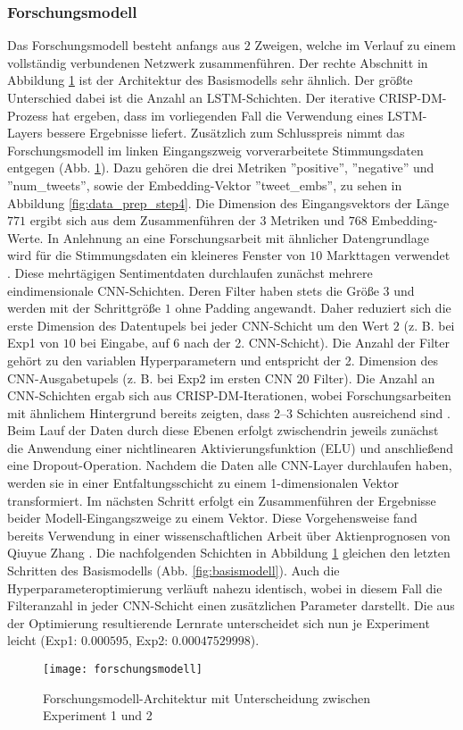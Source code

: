 \subsubsection{Forschungsmodell}\label{sec:modellierung_forsch}

Das Forschungsmodell besteht anfangs aus $2$ Zweigen, welche im Verlauf zu einem vollständig verbundenen Netzwerk zusammenführen. Der rechte Abschnitt in Abbildung \ref{fig:forschungsmodell} ist der Architektur des Basismodells sehr ähnlich. Der größte Unterschied dabei ist die Anzahl an \ac{LSTM}-Schichten. Der iterative \ac{CRISP-DM}-Prozess hat ergeben, dass im vorliegenden Fall die Verwendung eines \ac{LSTM}-Layers bessere Ergebnisse liefert.
Zusätzlich zum Schlusspreis nimmt das Forschungsmodell im linken Eingangszweig vorverarbeitete Stimmungsdaten entgegen (Abb. \ref{fig:forschungsmodell}). Dazu gehören die drei Metriken ''positive'', ''negative'' und ''num\_tweets'', sowie der Embedding-Vektor ''tweet\_embs'', zu sehen in Abbildung \ref{fig:data_prep_step4}. Die Dimension des Eingangsvektors der Länge $771$ ergibt sich aus dem Zusammenführen der $3$ Metriken und $768$ Embedding-Werte. In Anlehnung an eine Forschungsarbeit mit ähnlicher Datengrundlage wird für die Stimmungsdaten ein kleineres Fenster von $10$ Markttagen verwendet \autocite[Kap. 4.1]{zhang2022transformer}.
Diese mehrtägigen Sentimentdaten durchlaufen zunächst mehrere eindimensionale \ac{CNN}-Schichten. Deren Filter haben stets die Größe $3$ und werden mit der Schrittgröße $1$ ohne Padding angewandt. Daher reduziert sich die erste Dimension des Datentupels bei jeder \ac{CNN}-Schicht um den Wert $2$ (z. B. bei Exp1 von $10$ bei Eingabe, auf $6$ nach der 2. \ac{CNN}-Schicht). Die Anzahl der Filter gehört zu den variablen Hyperparametern und entspricht der 2. Dimension des \ac{CNN}-Ausgabetupels (z. B. bei Exp2 im ersten CNN $20$ Filter).
Die Anzahl an \ac{CNN}-Schichten ergab sich aus \ac{CRISP-DM}-Iterationen, wobei Forschungsarbeiten mit ähnlichem Hintergrund bereits zeigten, dass 2–3 Schichten ausreichend sind \autocite[Kap. 8.2]{guan2020stockprice}. Beim Lauf der Daten durch diese Ebenen erfolgt zwischendrin jeweils zunächst die Anwendung einer nichtlinearen Aktivierungsfunktion (\ac{ELU}) und anschließend eine Dropout-Operation.
Nachdem die Daten alle \ac{CNN}-Layer durchlaufen haben, werden sie in einer Entfaltungsschicht zu einem 1-dimensionalen Vektor transformiert.
Im nächsten Schritt erfolgt ein Zusammenführen der Ergebnisse beider Modell-Eingangszweige zu einem Vektor. Diese Vorgehensweise fand bereits Verwendung in einer wissenschaftlichen Arbeit über Aktienprognosen von Qiuyue Zhang \autocite[Kap. 4.2.1]{zhang2022transformer}.
Die nachfolgenden Schichten in Abbildung \ref{fig:forschungsmodell} gleichen den letzten Schritten des Basismodells (Abb. \ref{fig:basismodell}). Auch die Hyperparameteroptimierung verläuft nahezu identisch, wobei in diesem Fall die Filteranzahl in jeder CNN-Schicht einen zusätzlichen Parameter darstellt.
Die aus der Optimierung resultierende Lernrate unterscheidet sich nun je Experiment leicht (Exp1: $0.000595$, Exp2: $0.00047529998$).

\begin{figure}[H]
	\texttt{[image: forschungsmodell]}
	\caption{Forschungsmodell-Architektur mit Unterscheidung zwischen Experiment 1 und 2}
	\label{fig:forschungsmodell}
\end{figure}









